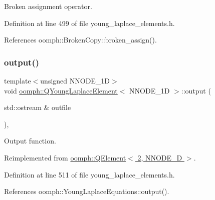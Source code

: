 Broken assignment operator. 



Definition at line 499 of file young\+\_\+laplace\+\_\+elements.\+h.



References oomph\+::\+Broken\+Copy\+::broken\+\_\+assign().

\mbox{\label{classoomph_1_1QYoungLaplaceElement_acd3dd1655fe2b9fd060a15ab9116eeae}} 
\subsubsection{\texorpdfstring{output()}{output()}\hspace{0.1cm}{\footnotesize\ttfamily [1/2]}}
{\footnotesize\ttfamily template$<$unsigned N\+N\+O\+D\+E\+\_\+1D$>$ \\
void \hyperlink{classoomph_1_1QYoungLaplaceElement}{oomph\+::\+Q\+Young\+Laplace\+Element}$<$ N\+N\+O\+D\+E\+\_\+1D $>$\+::output (\begin{DoxyParamCaption}\item[{std\+::ostream \&}]{outfile }\end{DoxyParamCaption})\hspace{0.3cm}{\ttfamily [inline]}, {\ttfamily [virtual]}}



Output function. 



Reimplemented from \hyperlink{classoomph_1_1QElement_3_012_00_01NNODE__1D_01_4_ab7bb815a43598e7ce0c4d10c511504fc}{oomph\+::\+Q\+Element$<$ 2, N\+N\+O\+D\+E\+\_\+D $>$}.



Definition at line 511 of file young\+\_\+laplace\+\_\+elements.\+h.



References oomph\+::\+Young\+Laplace\+Equations\+::output().

\mbox{\label{classoomph_1_1QYoungLaplaceElement_a4cbc12fd3e2e37de4985d00f6eed5a14}} 
